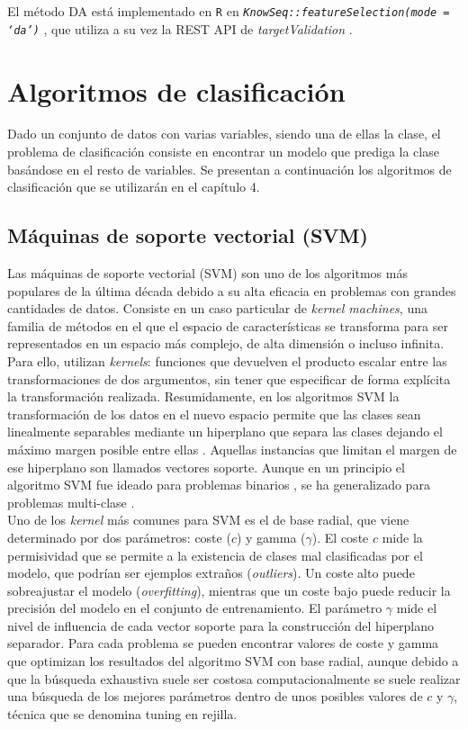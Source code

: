 El método DA  está implementado en \texttt{R}  en \textit{\texttt{KnowSeq::featureSelection(mode = `da')}} \cite{KnowSeq}, que utiliza a su vez la REST API de \textit{targetValidation} \cite{OpenTargets2020}.

\section{Algoritmos de clasificación}

Dado un conjunto de datos con varias variables, siendo una de ellas la clase, el problema de clasificación consiste en encontrar un modelo que prediga la clase basándose en el resto de variables. Se presentan a continuación los  algoritmos de clasificación que se utilizarán en el capítulo 4.

\subsection{Máquinas de soporte vectorial (SVM)}

Las máquinas de soporte vectorial (SVM) son uno de los algoritmos más populares de la última década debido a su alta eficacia en problemas con grandes cantidades de datos. Consiste en un caso particular de \textit{kernel machines}, una familia de métodos en el que el espacio de características se transforma para ser representados en un espacio más complejo, de alta dimensión o incluso infinita. Para ello, utilizan \textit{kernels}: funciones que devuelven el producto escalar entre las transformaciones de dos argumentos, sin tener que especificar de forma explícita la transformación realizada. Resumidamente, en los algoritmos SVM la transformación de los datos en el nuevo espacio permite que las clases sean linealmente separables mediante un hiperplano que separa las clases dejando el máximo margen posible entre ellas \cite{Boser1992}. Aquellas instancias que limitan el margen de ese hiperplano son llamados vectores soporte. Aunque en un principio el algoritmo SVM fue ideado para problemas binarios \cite{Boser1992}, se ha generalizado para problemas multi-clase \cite{Duan2005}.\\

Uno de los \textit{kernel} más comunes para SVM es el de base radial, que viene determinado por dos parámetros: coste ($c$) y gamma ($\gamma$). El coste $c$ mide la permisividad que se permite a la existencia de clases mal clasificadas por el modelo, que podrían ser ejemplos extraños (\textit{outliers}). Un coste alto puede sobreajustar el modelo (\textit{overfitting}), mientras que un coste bajo puede reducir la precisión del modelo en el conjunto de entrenamiento. El parámetro $\gamma$ mide el nivel de influencia de cada vector soporte para la construcción del hiperplano separador. Para cada problema se pueden encontrar valores de coste y gamma que optimizan los resultados del algoritmo SVM con base radial, aunque debido a que la búsqueda exhaustiva suele ser costosa computacionalmente se suele realizar una búsqueda de los mejores parámetros dentro de unos posibles valores de $c$ y $\gamma$, técnica que se denomina tuning en rejilla.\\

